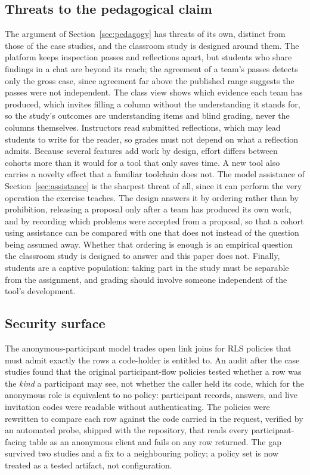 \documentclass[conference]{IEEEtran}
\begin{document}
\subsection*{Threats to the pedagogical claim}
The argument of Section~\ref{sec:pedagogy} has threats of its own, distinct
from those of the case studies, and the classroom study is designed around
them. The platform keeps inspection passes and reflections apart, but
students who share findings in a chat are beyond its reach; the agreement of
a team's passes detects only the gross case, since agreement far above the
published range suggests the passes were not independent. The class view
shows which evidence each team has produced, which invites filling a column
without the understanding it stands for, so the study's outcomes are
understanding items and blind grading, never the columns themselves.
Instructors read submitted reflections, which may lead students to write for
the reader, so grades must not depend on what a reflection admits. Because
several features add work by design, effort differs between cohorts more
than it would for a tool that only saves time. A new tool also carries a
novelty effect that a familiar toolchain does not. The model assistance of
Section~\ref{sec:assistance} is the sharpest threat of all, since it can
perform the very operation the exercise teaches. The design answers it by
ordering rather than by prohibition, releasing a proposal only after a team has
produced its own work, and by recording which problems were accepted from a
proposal, so that a cohort using assistance can be compared with one that does
not instead of the question being assumed away. Whether that ordering is enough
is an empirical question the classroom study is designed to answer and this
paper does not. Finally, students are a captive population: taking part in the
study must be separable from the assignment, and grading should involve someone
independent of the tool's development.

\subsection*{Security surface}
The anonymous-participant model trades open link joins for RLS
policies that must admit exactly the rows a code-holder is entitled
to. An audit after the case studies found that the original
participant-flow policies tested whether a row was the \emph{kind} a
participant may see, not whether the caller held its code, which for
the anonymous role is equivalent to no policy: participant records,
answers, and live invitation codes were readable without
authenticating. The policies were rewritten to compare each row against
the code carried in the request, verified by an automated probe,
shipped with the repository, that reads every participant-facing table
as an anonymous client and fails on any row returned. The gap survived
two studies and a fix to a neighbouring policy; a policy set is now
treated as a tested artifact, not configuration.
\end{document}
